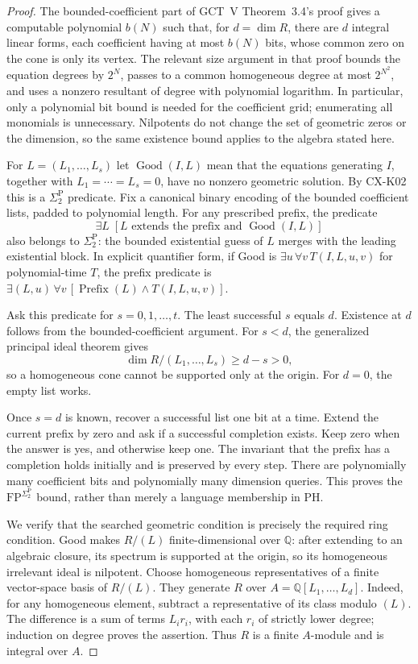 \begin{proof}
The bounded-coefficient part of GCT~V Theorem~3.4's proof gives a
computable polynomial $b(N)$ such that, for $d=\dim R$, there are
$d$ integral linear forms, each coefficient having at most $b(N)$
bits, whose common zero on the cone is only its vertex. The relevant
size argument in that proof bounds the equation degrees by $2^N$,
passes to a common homogeneous degree at most $2^{N^2}$, and uses a
nonzero resultant of degree with polynomial logarithm. In particular,
only a polynomial bit bound is needed for the coefficient grid;
enumerating all monomials is unnecessary. Nilpotents do not change
the set of geometric zeros or the dimension, so the same existence
bound applies to the algebra stated here.

For $L=(L_1,\ldots,L_s)$ let $\operatorname{Good}(I,L)$ mean that
the equations generating $I$, together with $L_1=\cdots=L_s=0$,
have no nonzero geometric solution. By CX-K02 this is a
$\Sigma_2^{\mathrm P}$ predicate. Fix a canonical binary encoding
of the bounded coefficient lists, padded to polynomial length. For
any prescribed prefix, the predicate
\[
 \exists L\;[\text{$L$ extends the prefix and }
                    \operatorname{Good}(I,L)]
\]
also belongs to $\Sigma_2^{\mathrm P}$: the bounded existential
guess of $L$ merges with the leading existential block. In explicit
quantifier form, if Good is $\exists u\,\forall v\,T(I,L,u,v)$
for polynomial-time $T$, the prefix predicate is
$\exists (L,u)\,\forall v\,[\operatorname{Prefix}(L)\land
T(I,L,u,v)]$.

Ask this predicate for $s=0,1,\ldots,t$. The least successful $s$
equals $d$. Existence at $d$ follows from the bounded-coefficient
argument. For $s<d$, the generalized principal ideal theorem gives
\[
 \dim R/(L_1,\ldots,L_s)\ge d-s>0,
\]
so a homogeneous cone cannot be supported only at the origin.
For $d=0$, the empty list works.

Once $s=d$ is known, recover a successful list one bit at a time.
Extend the current prefix by zero and ask if a successful completion
exists. Keep zero when the answer is yes, and otherwise keep one.
The invariant that the prefix has a completion holds initially and
is preserved by every step. There are polynomially many coefficient
bits and polynomially many dimension queries. This proves the
$\mathrm{FP}^{\Sigma_2^{\mathrm P}}$ bound, rather than merely a
language membership in PH.

We verify that the searched geometric condition is precisely the
required ring condition. Good makes $R/(L)$ finite-dimensional over
$\mathbb Q$: after extending to an algebraic closure, its spectrum is
supported at the origin, so its homogeneous irrelevant ideal is
nilpotent. Choose homogeneous representatives of a finite vector-space
basis of $R/(L)$. They generate $R$ over
$A=\mathbb Q[L_1,\ldots,L_d]$. Indeed, for any homogeneous element,
subtract a representative of its class modulo $(L)$. The difference
is a sum of terms $L_i r_i$, with each $r_i$ of strictly lower degree;
induction on degree proves the assertion. Thus $R$ is a finite
$A$-module and is integral over $A$.


\end{proof}
